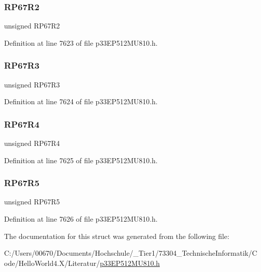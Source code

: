 \subsubsection{\texorpdfstring{R\+P67\+R2}{RP67R2}}
{\footnotesize\ttfamily unsigned R\+P67\+R2}



Definition at line 7623 of file p33\+E\+P512\+M\+U810.\+h.

\mbox{\label{structtag_r_p_o_r1_b_i_t_s_aa95b30694db41eec385d9b9fa95ee23a}} 
\subsubsection{\texorpdfstring{R\+P67\+R3}{RP67R3}}
{\footnotesize\ttfamily unsigned R\+P67\+R3}



Definition at line 7624 of file p33\+E\+P512\+M\+U810.\+h.

\mbox{\label{structtag_r_p_o_r1_b_i_t_s_a3a440bea44f733a17e99d4a162455ad3}} 
\subsubsection{\texorpdfstring{R\+P67\+R4}{RP67R4}}
{\footnotesize\ttfamily unsigned R\+P67\+R4}



Definition at line 7625 of file p33\+E\+P512\+M\+U810.\+h.

\mbox{\label{structtag_r_p_o_r1_b_i_t_s_a5e0222196702752abc55e0983dc2b414}} 
\subsubsection{\texorpdfstring{R\+P67\+R5}{RP67R5}}
{\footnotesize\ttfamily unsigned R\+P67\+R5}



Definition at line 7626 of file p33\+E\+P512\+M\+U810.\+h.



The documentation for this struct was generated from the following file\+:\begin{DoxyCompactItemize}
\item 
C\+:/\+Users/00670/\+Documents/\+Hochschule/\+\_\+\+Tier1/73304\+\_\+\+Technische\+Informatik/\+Code/\+Hello\+World4.\+X/\+Literatur/\hyperlink{p33_e_p512_m_u810_8h}{p33\+E\+P512\+M\+U810.\+h}\end{DoxyCompactItemize}
